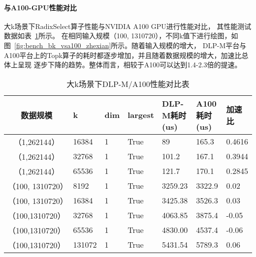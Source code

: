 \paragraph{与A100-GPU性能对比}
大k场景下RadixSelect算子性能与NVIDIA A100 GPU进行性能对比，
其性能测试数据如表~\ref{tab:bkvsa100}所示。
在相同输入规模（100, 1310720），不同k值下进行绘图，如图~\ref{fig:bench_bk_vsa100_zhexian}所示。随着输入规模的增大，
DLP-M平台与A100平台上的Topk算子的耗时都逐步增加，并且随着数据规模的增大，加速比总体上呈现
逐步下降的趋势。整体而言，相较于A100可以达到1.4-2.3倍的提速。
\begin{table}
    \label{tab:bkvsa100}
    \centering
    \caption{大k场景下DLP-M/A100性能对比表}
    \begin{tabular}{cllllll}
    \toprule
    数据规模 & k&  dim     & largest      &   DLP-M耗时(us) & A100耗时(us) & 加速比 \\
    \midrule

    
    （1,262144） & 16384   &  1     & True & 89 & 165.3 & 0.4616  \\
    （1,262144） & 32768   &  1     & True & 101.2 & 167.1 & 0.3944 \\
    （1,262144） & 65536   &  1     & True & 121.7 & 170.1 & 0.2845 \\
    
    （100, 1310720）& 8192 &  1     & True & 3259.23 & 3322.9 & 0.02\\
    （100, 1310720）& 16384 &  1     & True & 3425.38 & 3526.3 & 0.03\\
    （100,1310720）&32768    & 1     & True &  4063.85 & 3875.4 & -0.05  \\
    （100,1310720）&65536    &  1     & True & 4830.00 & 4537.4 & -0.06 \\
    （100,1310720）&131072   &  1     & True & 5431.54 & 5789.3 & 0.06 \\
  
    \bottomrule
    \end{tabular}
    \end{table}


